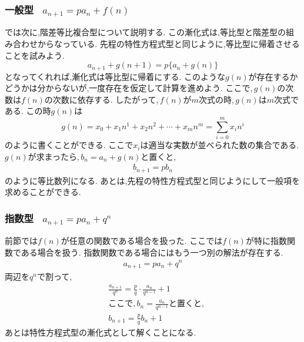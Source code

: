 
\subsubsection{一般型 \, $\displaystyle a_{n+1}=pa_n+f(n)$}
では次に,階差等比複合型について説明する.
この漸化式は,等比型と階差型の組み合わせからなっている.
先程の特性方程式型と同じように,等比型に帰着させることを試みよう.
\[
  a_{n+1}+g(n+1)=p\{a_n+g(n)\}
\]
となってくれれば,漸化式は等比型に帰着にする.
このような$g(n)$が存在するかどうかは分からないが,一度存在を仮定して計算を進めよう.
ここで,\,$g(n)$の次数は$f(n)$の次数に依存する.
  したがって,\,$f(n)$が$m$次式の時,\,$g(n)$は$m$次式である.
この時$g(n)$は
\[
  g(n) = x_0 + x_1 n^1 + x_2 n^2  + \cdots +x_{m} n^m =\sum_{i=0}^{m} x_i n^{i}
\]
のように書くことができる.
ここで$x_i$は適当な実数が並べられた数の集合である.
$g(n)$が求まったら,\,$b_n=a_n+g(n)$と置くと,
\begin{align*}
  b_{n+1}=pb_n
\end{align*}
のように等比数列になる.
あとは,先程の特性方程式型と同じようにして一般項を求めることができる.
\subsubsection{指数型  \, $\displaystyle a_{n+1}=pa_n+q^n$}
前節では$f(n)$が任意の関数である場合を扱った.
ここでは$f(n)$が特に指数関数である場合を扱う.
指数関数である場合にはもう一つ別の解法が存在する.
\begin{align*}
  a_{n+1}=pa_n+q^n
\end{align*}
両辺を$q^n$で割って,
\begin{align*}
   & \frac{a_{n+1}}{q^n}=\frac{p}{q}\cdot\frac{a_n}{q^{n-1}}+1 \\
   & \text{ここで,}\,b_n=\frac{a_n}{q^{n-1}}\text{と置くと,}          \\
   & b_{n+1}=\frac{p}{q}b_n+1
\end{align*}
あとは特性方程式型の漸化式として解くことになる.
